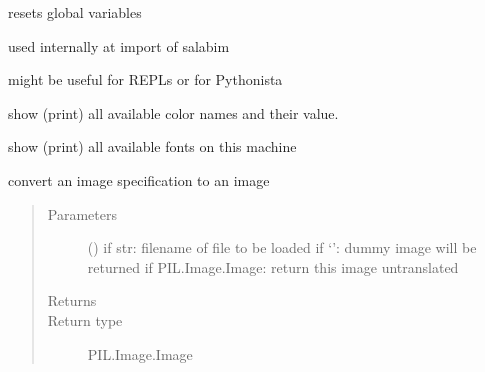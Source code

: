 \documentclass[letterpaper,10pt,english]{sphinxmanual}
\begin{document}

\begin{fulllineitems}
\label{\detokenize{Reference:salabim.reset}}
resets global variables

used internally at import of salabim

might be useful for REPLs or for Pythonista

\end{fulllineitems}


\begin{fulllineitems}
\label{\detokenize{Reference:salabim.show_colornames}}
show (print) all available color names and their value.

\end{fulllineitems}


\begin{fulllineitems}
\label{\detokenize{Reference:salabim.show_fonts}}
show (print) all available fonts on this machine

\end{fulllineitems}


\begin{fulllineitems}
\label{\detokenize{Reference:salabim.spec_to_image}}
convert an image specification to an image
\begin{quote}\begin{description}
\item[{Parameters}] \leavevmode
{} () \textendash{} if str: filename of file to be loaded 
if ‘’: dummy image will be returned 
if PIL.Image.Image: return this image untranslated

\item[{Returns}] \leavevmode
{}

\item[{Return type}] \leavevmode
PIL.Image.Image

\end{description}\end{quote}

\end{fulllineitems}
\end{document}
